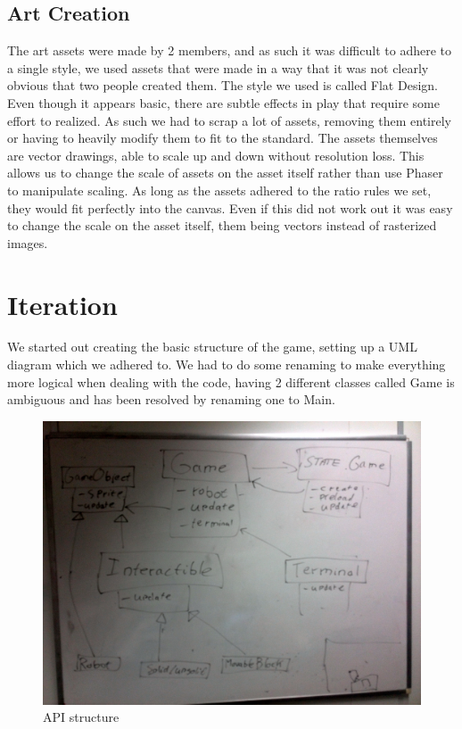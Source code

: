 \documentclass[a4paper,twoside,12pt]{article}
\begin{document}
\subsection{Art Creation}
The art assets were made by 2 members, and as such it was difficult to adhere to a single style, we used assets that were made in a way that it was not clearly obvious that two people created them. The style we used is called Flat Design. Even though it appears basic, there are subtle effects in play that require some effort to realized. As such we had to scrap a lot of assets, removing them entirely or having to heavily modify them to fit to the standard. The assets themselves are vector drawings, able to scale up and down without resolution loss. This allows us to
change the scale of assets on the asset itself rather than use Phaser to manipulate scaling. As long as the assets adhered to the ratio rules we set, they would fit perfectly into the canvas. Even if this did not work out it was easy to change the scale on the asset itself, them being vectors instead of rasterized images.

\section{Iteration}
We started out creating the basic structure of the game, setting up a UML
diagram which we adhered to. We had to do some renaming to make everything
more logical when dealing with the code, having 2 different classes called
Game is ambiguous and has been resolved by renaming one to Main.
\\
\begin{figure}[H]
  \includegraphics[width=1\textwidth]{API}
  \caption{API structure} 
\end{figure}
\end{document}
